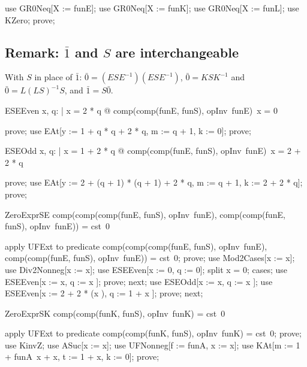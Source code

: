 \documentclass{article}
\begin{document}
\begin{zproof}
use GR0Neq[X := funE];
use GR0Neq[X := funK];
use GR0Neq[X := funL];
use KZero;
prove;
\end{zproof}

\subsection{Remark: $\bar 1$ and $S$ are interchangeable}

With $S$ in place of $\bar 1$: $\bar 0 = (E S E^{-1})(E S E^{-1})$, $\bar 0 = K S K^{-1}$ and
$\bar 0 = L (L S)^{-1} S$, and $\bar 1 = S \bar 0$.

\begin{theorem}{ESEEven}
  \forall x, q: \nat | x = 2 * q @ comp(comp(funE, funS), opInv~funE)~x = 0
\end{theorem}

\begin{zproof}
prove;
use EAt[y := 1 + q * q + 2 * q, m := q + 1, k := 0];
prove;
\end{zproof}

\begin{theorem}{ESEOdd}
  \forall x, q: \nat | x = 1 + 2 * q @ comp(comp(funE, funS), opInv~funE)~x = 2 + 2 * q
\end{theorem}

\begin{zproof}
prove;
use EAt[y := 2 + (q + 1) * (q + 1) + 2 * q, m := q + 1, k := 2 + 2 * q];
prove;
\end{zproof}

\begin{theorem}{ZeroExprSE}
  comp(comp(comp(funE, funS), opInv~funE), comp(comp(funE, funS), opInv~funE)) = cst~0
\end{theorem}

\begin{zproof}
apply UFExt to predicate comp(comp(comp(funE, funS), opInv~funE), comp(comp(funE, funS), opInv~funE)) = cst~0;
prove;
use Mod2Cases[x := x];
use Div2Nonneg[x := x];
use ESEEven[x := 0, q := 0];
split x  = 0;
cases;
use ESEEven[x := x, q := x ];
prove;
next;
use ESEOdd[x := x, q := x ];
use ESEEven[x := 2 + 2 * (x ), q := 1 + x ];
prove;
next;
\end{zproof}

\begin{theorem}{ZeroExprSK}
  comp(comp(funK, funS), opInv~funK) = cst~0
\end{theorem}

\begin{zproof}
apply UFExt to predicate comp(comp(funK, funS), opInv~funK) = cst~0;
prove;
use KinvZ;
use ASuc[x := x];
use UFNonneg[f := funA, x := x];
use KAt[m := 1 + funA~x + x, t := 1 + x, k := 0];
prove;
\end{zproof}
\end{document}
